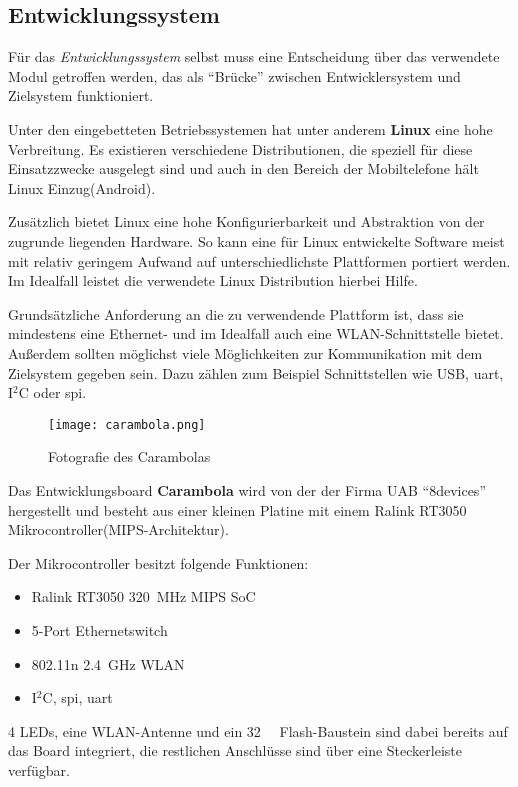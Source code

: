 \subsection{Entwicklungssystem}
Für das \emph{Entwicklungssystem} selbst muss eine Entscheidung über das
verwendete Modul getroffen werden, das als "`Brücke"' zwischen Entwicklersystem
und Zielsystem funktioniert.

Unter den eingebetteten Betriebssystemen hat unter anderem \textbf{Linux} eine
hohe Verbreitung. Es existieren verschiedene Distributionen, die speziell für
diese Einsatzzwecke ausgelegt sind und auch in den Bereich der Mobiltelefone
hält Linux Einzug(Android).

Zusätzlich bietet Linux eine hohe Konfigurierbarkeit und Abstraktion von der
zugrunde liegenden Hardware. So kann eine für Linux entwickelte Software meist
mit relativ geringem Aufwand auf unterschiedlichste Plattformen portiert werden.
Im Idealfall leistet die verwendete Linux Distribution hierbei Hilfe.

Grundsätzliche Anforderung an die zu verwendende Plattform ist, dass sie
mindestens eine Ethernet- und im Idealfall auch eine WLAN-Schnittstelle bietet.
Außerdem sollten möglichst viele Möglichkeiten zur Kommunikation mit dem
Zielsystem gegeben sein. Dazu zählen zum Beispiel Schnittstellen wie USB,
\gls{uart}, I$^2$C oder \gls{spi}.

\begin{figure}[!ht]
\centering
\texttt{[image: carambola.png]}\\
\caption{Fotografie des Carambolas}{}
\end{figure}

Das Entwicklungsboard \textbf{Carambola}\cite{CARAM1} wird von der der Firma UAB
"`8devices"' hergestellt und besteht aus einer kleinen Platine mit einem Ralink
RT3050\cite{RA01} Mikrocontroller(MIPS-Architektur).

Der Mikrocontroller besitzt folgende Funktionen: 
\begin{itemize}
  \item Ralink RT3050 \SI{320}{\mega\hertz} MIPS SoC
  \item 5-Port Ethernetswitch
  \item 802.11n \SI{2,4}{\giga\hertz} WLAN
  \item I$^2$C, \gls{spi}, \gls{uart}
\end{itemize}
4 LEDs, eine WLAN-Antenne und ein \SI{32}{\mega\byte} Flash-Baustein sind dabei
bereits auf das Board integriert, die restlichen Anschlüsse sind über eine
Steckerleiste verfügbar.


